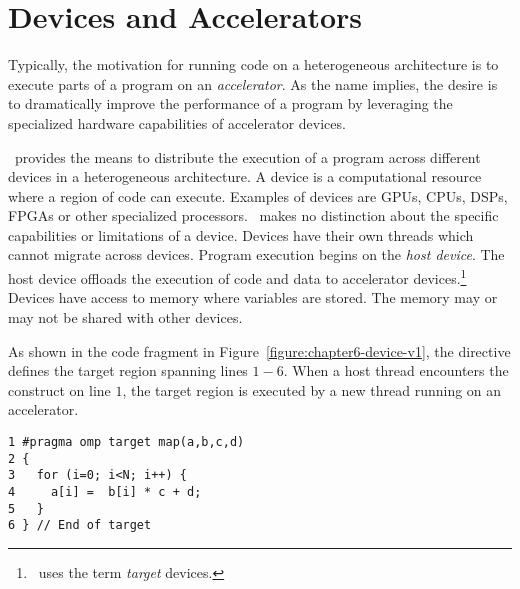 
\section{Devices and Accelerators}
\label{sec:06.devices}

Typically, the motivation for running code on a heterogeneous architecture is
to execute parts of a program on an \emph{accelerator}.  As the name implies,
the desire is to dramatically improve the performance of a program by
leveraging the specialized hardware capabilities of accelerator devices.  

\OMP\ provides the means to distribute the execution of a program across
different devices in a heterogeneous architecture.  A device is a computational
resource where a region of code can execute.  Examples of devices are GPUs,
CPUs, DSPs, FPGAs or other specialized processors.  \OMP\ makes no distinction
about the specific capabilities or limitations of a device.  Devices have their
own threads which cannot migrate across devices.  Program execution begins on
the \emph{host device}.  The host device offloads the execution of code and
data to accelerator devices.\footnote{\OMP\ uses the term \emph{target}
devices.}  Devices have access to memory where variables are stored.  The
memory may or may not be shared with other devices.

As shown in the code fragment in Figure~\ref{figure:chapter6-device-v1}, the
 directive defines the target region spanning lines
$1-6$.   When a host thread encounters the  construct on line
$1$, the target region is executed by a new thread running on an accelerator. 

\begin{figure*}[!tb]
\begin{verbatim}
1 #pragma omp target map(a,b,c,d)
2 {
3   for (i=0; i<N; i++) {
4     a[i] =  b[i] * c + d;
5   }
6 } // End of target
\end{verbatim}
\caption{ \textbf {Code fragment with one target region} -- \small
          The target region is executed by a thread running on
          an accelerator.
         }
\label{figure:chapter6-device-v1}
\end{figure*}

